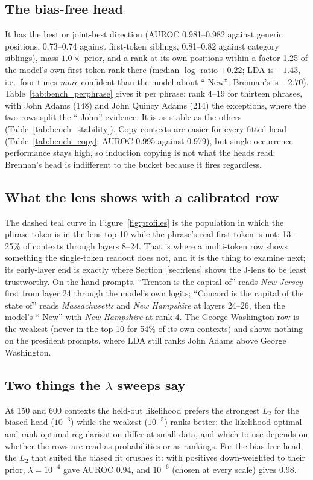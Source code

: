 \documentclass[11pt]{article}
\begin{document}
\subsection{The bias-free head}
It has the best or joint-best direction (AUROC 0.981--0.982 against generic positions, 0.73--0.74 against first-token siblings, 0.81--0.82 against category siblings), mass $1.0\times$ prior, and a rank at its own positions within a factor 1.25 of the model's own first-token rank there (median $\log$ ratio $+0.22$; LDA is $-1.43$, i.e.\ four times \emph{more} confident than the model about `` New''; Brennan's is $-2.70$). Table~\ref{tab:bench_perphrase} gives it per phrase: rank 4--19 for thirteen phrases, with John Adams (148) and John Quincy Adams (214) the exceptions, where the two rows split the `` John'' evidence. It is as stable as the others (Table~\ref{tab:bench_stability}). Copy contexts are easier for every fitted head (Table~\ref{tab:bench_copy}: AUROC 0.995 against 0.979), but single-occurrence performance stays high, so induction copying is not what the heads read; Brennan's head is indifferent to the bucket because it fires regardless.




\subsection{What the lens shows with a calibrated row}
The dashed teal curve in Figure~\ref{fig:profiles} is the population in which the phrase token is in the lens top-10 while the phrase's real first token is not: 13--25\% of contexts through layers 8--24. That is where a multi-token row shows something the single-token readout does not, and it is the thing to examine next; its early-layer end is exactly where Section~\ref{sec:rlens} shows the J-lens to be least trustworthy. On the hand prompts, ``Trenton is the capital of'' reads \emph{New Jersey} first from layer 24 through the model's own logits; ``Concord is the capital of the state of'' reads \emph{Massachusetts} and \emph{New Hampshire} at layers 24--26, then the model's `` New'' with \emph{New Hampshire} at rank 4. The George Washington row is the weakest (never in the top-10 for 54\% of its own contexts) and shows nothing on the president prompts, where LDA still ranks John Adams above George Washington.

\subsection{Two things the $\lambda$ sweeps say}
At 150 and 600 contexts the held-out likelihood prefers the strongest $L_2$ for the biased head ($10^{-3}$) while the weakest ($10^{-5}$) ranks better; the likelihood-optimal and rank-optimal regularisation differ at small data, and which to use depends on whether the rows are read as probabilities or as rankings. For the bias-free head, the $L_2$ that suited the biased fit crushes it: with positives down-weighted to their prior, $\lambda=10^{-4}$ gave AUROC 0.94, and $10^{-6}$ (chosen at every scale) gives 0.98.
\end{document}
